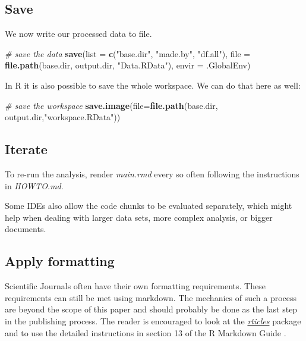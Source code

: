 \documentclass[11pt,]{article}
\newenvironment{Shaded}{\begin{snugshade}}{\end{snugshade}}
\newcommand{\CommentTok}[1]{\textcolor[rgb]{0.56,0.35,0.01}{\textit{#1}}}
\newcommand{\DataTypeTok}[1]{\textcolor[rgb]{0.13,0.29,0.53}{#1}}
\newcommand{\KeywordTok}[1]{\textcolor[rgb]{0.13,0.29,0.53}{\textbf{#1}}}
\newcommand{\NormalTok}[1]{#1}
\newcommand{\StringTok}[1]{\textcolor[rgb]{0.31,0.60,0.02}{#1}}
\begin{document}
\hypertarget{implementSave}{%
\subsection{Save}\label{implementSave}}

We now write our processed data to file.

\begin{Shaded}
\begin{Highlighting}[]
\CommentTok{# save the data}
\KeywordTok{save}\NormalTok{(}\DataTypeTok{list =} \KeywordTok{c}\NormalTok{(}\StringTok{"base.dir"}\NormalTok{,}
              \StringTok{"made.by"}\NormalTok{,}
              \StringTok{"df.all"}\NormalTok{),}
       \DataTypeTok{file =} \KeywordTok{file.path}\NormalTok{(base.dir, output.dir, }\StringTok{"Data.RData"}\NormalTok{),}
       \DataTypeTok{envir =}\NormalTok{ .GlobalEnv)}
\end{Highlighting}
\end{Shaded}

In R it is also possible to save the whole workspace. We can do that here as well:

\begin{Shaded}
\begin{Highlighting}[]
\CommentTok{# save the workspace}
\KeywordTok{save.image}\NormalTok{(}\DataTypeTok{file=}\KeywordTok{file.path}\NormalTok{(base.dir, output.dir,}\StringTok{"workspace.RData"}\NormalTok{))}
\end{Highlighting}
\end{Shaded}

\hypertarget{implementIterate}{%
\subsection{Iterate}\label{implementIterate}}

To re-run the analysis, render \emph{main.rmd} every so often following the instructions in \emph{HOWTO.md}.

Some IDEs also allow the code chunks to be evaluated separately, which might help when dealing with larger data sets, more complex analysis, or bigger documents.

\hypertarget{implementFformat}{%
\subsection{Apply formatting}\label{implementFformat}}

Scientific Journals often have their own formatting requirements. These requirements can still be met using markdown. The mechanics of such a process are beyond the scope of this paper and should probably be done as the last step in the publishing process. The reader is encouraged to look at the \href{https://github.com/rstudio/rticles}{\emph{rticles}} package and to use the detailed instructions in section 13 of the R Markdown Guide \citep{R-Markdown-Guide}.
\end{document}

